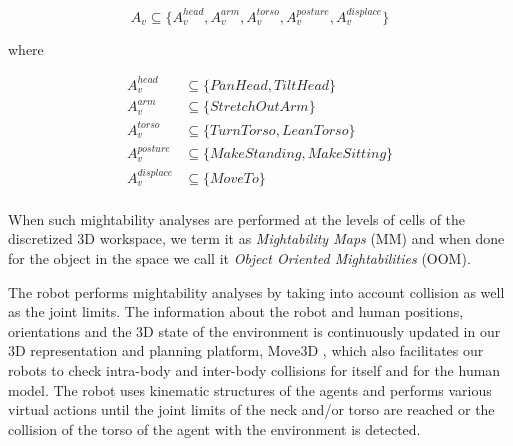 \documentclass{svmult}
\begin{document}
\[ 
A_v \subseteq \{A_v^{head}, A_v^{arm}, A_v^{torso}, A_v^{posture}, A_v^{displace}\}
\]

where

\begin{align*}
A_v^{head} & \subseteq \{PanHead, TiltHead\} \\
A_v^{arm} & \subseteq \{StretchOutArm\} \\
A_v^{torso} & \subseteq \{TurnTorso, LeanTorso\} \\
A_v^{posture} & \subseteq \{MakeStanding, MakeSitting\} \\
A_v^{displace} & \subseteq \{MoveTo\} \\
\end{align*}

When such mightability analyses are performed at the levels of cells of the
discretized 3D workspace, we term it as \emph{Mightability Maps} (MM) and when done
for the object in the space we call it \emph{Object Oriented Mightabilities} (OOM).

The robot performs mightability analyses by taking into account collision
as well as the joint limits. The information about the robot and human
positions, orientations and the 3D state of the environment is continuously
updated in our 3D representation and planning platform, Move3D \cite{Simeon2001}, which
also facilitates our robots to check intra-body and inter-body collisions
for itself and for the human model. The robot uses kinematic structures of
the agents and performs various virtual actions until the joint limits
of the neck and/or torso are reached or the collision of the torso of
the agent with the environment is detected.
\end{document}
